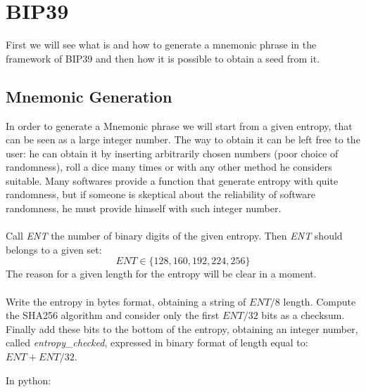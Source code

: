 \section{BIP39}
First we will see what is and how to generate a mnemonic phrase in the framework of BIP39 and then how it is possible to obtain a seed from it.

\subsection{Mnemonic Generation}
In order to generate a Mnemonic phrase we will start from a given entropy, that can be seen as a large integer number. The way to obtain it can be left free to the user: he can obtain it by inserting arbitrarily chosen numbers (poor choice of randomness), roll a dice many times or with any other method he considers suitable. Many softwares provide a function that generate entropy with quite randomness, but if someone is skeptical about the reliability of software randomness, he must provide himself with such integer number.
\\ \\
Call \textit{ENT} the number of binary digits of the given entropy. Then \textit{ENT} should belongs to a given set:
\begin{equation*}
	ENT \in \{128,160,192,224,256\}
\end{equation*}
The reason for a given length for the entropy will be clear in a moment.
\\ \\
Write the entropy in bytes format, obtaining a string of $ENT/8$ length. Compute the SHA256 algorithm and consider only the first $ENT/32$ bits as a checksum. Finally add these bits to the bottom of the entropy, obtaining an integer number, called \textit{entropy\_checked}, expressed in binary format of length equal to: $ENT+ENT/32$.

\begin{flushleft}
	In python:
\end{flushleft}

